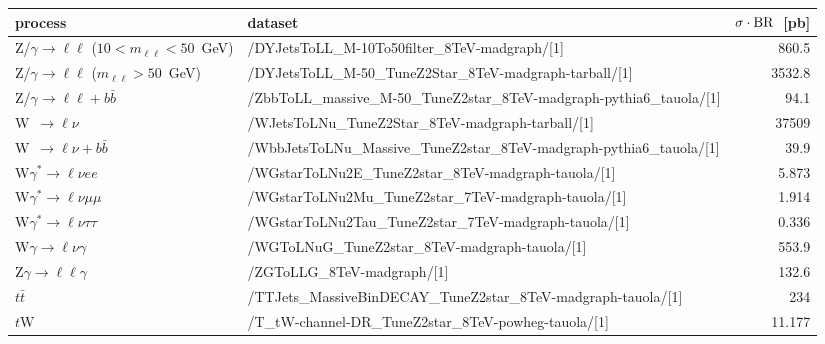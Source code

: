 \documentclass[a4paper]{jpconf}
\begin{document}
\begin{landscape}


\begin{table}[ht]
\begin{small}
\begin{center}
\begin{tabular}{l|l|r}
\hline
 process                                              & dataset                                                                & $\sigma\cdot\rm{BR}$~[pb]\\
\hline
 Z/$\gamma\to\ell\ell$ ($10 < m_{\ell\ell} < 50$~GeV) & /DYJetsToLL\_M-10To50filter\_8TeV-madgraph/[1]                         &   860.5\\
 Z/$\gamma\to\ell\ell$ ($m_{\ell\ell} > 50$~GeV)      & /DYJetsToLL\_M-50\_TuneZ2Star\_8TeV-madgraph-tarball/[1]               &  3532.8\\
 Z/$\gamma\to\ell\ell + b\bar{b}$                     & /ZbbToLL\_massive\_M-50\_TuneZ2star\_8TeV-madgraph-pythia6\_tauola/[1] &    94.1\\
 W~$\to\ell\nu$                                       & /WJetsToLNu\_TuneZ2Star\_8TeV-madgraph-tarball/[1]                     &   37509\\
 W~$\to\ell\nu + b\bar{b}$                            & /WbbJetsToLNu\_Massive\_TuneZ2star\_8TeV-madgraph-pythia6\_tauola/[1]  &    39.9\\
 W$\gamma^{*}\to\ell\nu ee$                           & /WGstarToLNu2E\_TuneZ2star\_8TeV-madgraph-tauola/[1]                   &   5.873\\
 W$\gamma^{*}\to\ell\nu\mu\mu$                        & /WGstarToLNu2Mu\_TuneZ2star\_7TeV-madgraph-tauola/[1]                  &   1.914\\
 W$\gamma^{*}\to\ell\nu\tau\tau$                      & /WGstarToLNu2Tau\_TuneZ2star\_7TeV-madgraph-tauola/[1]                 &   0.336\\
 W$\gamma\to\ell\nu\gamma$                            & /WGToLNuG\_TuneZ2star\_8TeV-madgraph-tauola/[1]                        &   553.9\\
 Z$\gamma\to\ell\ell\gamma$                           & /ZGToLLG\_8TeV-madgraph/[1]                                            &   132.6\\
 $t\bar{t}$                                           & /TTJets\_MassiveBinDECAY\_TuneZ2star\_8TeV-madgraph-tauola/[1]         &     234\\
 $t$W                                                 & /T\_tW-channel-DR\_TuneZ2star\_8TeV-powheg-tauola/[1]                  &  11.177\\

\end{tabular}
\end{center}
\end{small}
\end{table}
\end{landscape}
\end{document}

